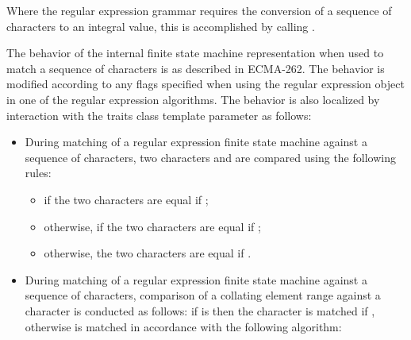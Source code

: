 \pnum
Where the regular expression grammar requires the conversion of a sequence of characters
to an integral value, this is accomplished by calling .

\pnum
{}%
The behavior of the internal finite state machine representation when used to match a
sequence of characters is as described in ECMA-262.
The behavior is modified according
to any  flags specified when using the regular expression
object in one of the regular expression algorithms. The behavior is also
localized by interaction with the traits class template parameter as follows:
\begin{itemize}
\item During matching of a regular expression finite state machine
against a sequence of characters, two characters 
and  are compared using the following rules:
\begin{itemize}
\item if  the two characters are equal
if ;
%
%
\item otherwise, if  the
two characters are equal if
;
%
%
%
\item otherwise, the two characters are equal if .
\end{itemize}

\item During matching of a regular expression finite state machine
against a sequence of characters, comparison of a collating element
range  against a character  is
conducted as follows: if 
is  then the character  is matched if , otherwise  is matched in
accordance with the following algorithm:


\end{itemize}
